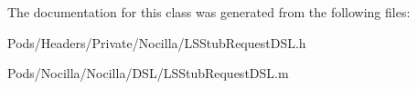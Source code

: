 The documentation for this class was generated from the following files\-:\begin{DoxyCompactItemize}
\item 
Pods/\-Headers/\-Private/\-Nocilla/L\-S\-Stub\-Request\-D\-S\-L.\-h\item 
Pods/\-Nocilla/\-Nocilla/\-D\-S\-L/L\-S\-Stub\-Request\-D\-S\-L.\-m\end{DoxyCompactItemize}
